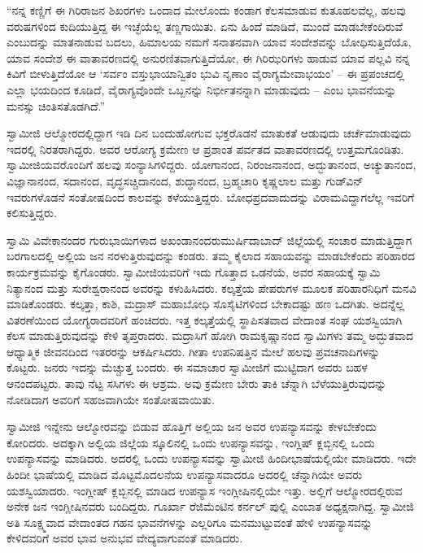  “ನನ್ನ ಕಣ್ಣಿಗೆ ಈ ಗಿರಿರಾಜನ ಶಿಖರಗಳು ಒಂದಾದ ಮೇಲೊಂದು ಕಂಡಾಗ ಕೆಲಸಮಾಡುವ ಕುತೂಹಲವೆಲ್ಲ, ಹಲವು ವರುಷಗಳಿಂದ ಕುದಿಯುತ್ತಿದ್ದ ಈ ಇಚ್ಛೆಯೆಲ್ಲ ತಣ್ಣಗಾಯಿತು. ಏನು ಹಿಂದೆ ಮಾಡಿದೆ, ಮುಂದೆ ಮಾಡಬೇಕೆಂದಿರುವೆ ಎಂಬುದನ್ನು ಮಾತನಾಡುವ ಬದಲು, ಹಿಮಾಲಯ ನಮಗೆ ಸನಾತನವಾಗಿ ಯಾವ ಸಂದೇಶವನ್ನು ಬೋಧಿಸುತ್ತಿದೆಯೊ, ಯಾವ ಸಂದೇಶ ಈ ವಾತಾವರಣದಲ್ಲಿ ಅನುರಣಿತವಾಗುತ್ತಿದೆಯೋ, ಈ ಗಿರಿಝರಿಗಳು ಹಾಡುವ ಯಾವ ಪಲ್ಲವಿ ನನ್ನ ಕಿವಿಗೆ ಬೀಳುತ್ತಿದೆಯೋ ಆ ‘ಸರ್ವಂ ವಸ್ತುಭಾಯಾನ್ವಿತಂ ಭುವಿ ನೃಣಾಂ ವೈರಾಗ್ಯಮೇವಾಭಯಂ’ – ಈ ಪ್ರಪಂಚದಲ್ಲಿ ಎಲ್ಲಾ ಭಯದಿಂದ ಕೂಡಿದೆ, ವೈರಾಗ್ಯವೊಂದೇ ಒಬ್ಬನನ್ನು ನಿರ್ಭೀತನನ್ನಾಗಿ ಮಾಡುವುದು – ಎಂಬ ಭಾವನೆಯನ್ನು ಮನಸ್ಸು ಚಿಂತಿಸತೊಡಗಿದೆ.” 

 ಸ್ವಾಮೀಜಿ ಆಲ್ಮೋರದಲ್ಲಿದ್ದಾಗ ಇಡಿ ದಿನ ಬಂದುಹೋಗುವ ಭಕ್ತರೊಡನೆ ಮಾತುಕತೆ ಆಡುವುದು ಚರ್ಚೆಮಾಡುವುದು ಇದರಲ್ಲಿ ನಿರತರಾಗಿದ್ದರು. ಅವರ ಆರೋಗ್ಯ ಕ್ರಮೇಣ ಆ ಪ್ರಶಾಂತ ಪರ್ವತದ ವಾತಾವರಣದಲ್ಲಿ ಉತ್ತಮಗೊಂಡಿತು. ಸ್ವಾಮೀಜಿಯವರೊಂದಿಗೆ ಹಲವು ಸಂನ್ಯಾಸಿಗಳಿದ್ದರು. ಯೋಗಾನಂದ, ನಿರಂಜನಾನಂದ, ಅದ್ಭುತಾನಂದ, ಅಚ್ಯುತಾನಂದ, ವಿಜ್ಞಾನಾನಂದ, ಸದಾನಂದ, ವೃದ್ಧಸಚ್ಚಿದಾನಂದ, ಶುದ್ಧಾನಂದ, ಬ್ರಹ್ಮಚಾರಿ ಕೃಷ್ಣಲಾಲ ಮತ್ತು ಗುಡ್‍ವಿನ್ ಇವರುಗಳೊಡನೆ ಸಂತೋಷದಿಂದ ಕಾಲವನ್ನು ಕಳೆಯುತ್ತಿದ್ದರು. ಬೋಧಪ್ರದವಾದುದನ್ನು ವಿರಾಮವಿದ್ದಾಗಲೆಲ್ಲ ಇವರಿಗೆ ಕಲಿಸುತ್ತಿದ್ದರು. 

 ಸ್ವಾಮಿ ವಿವೇಕಾನಂದರ ಗುರುಭಾಯಿಗಳಾದ ಅಖಂಡಾನಂದರು\break ಮುರ್ಷಿದಾಬಾದ್ ಜಿಲ್ಲೆಯಲ್ಲಿ ಸಂಚಾರ ಮಾಡುತ್ತಿದ್ದಾಗ ಬರಗಾಲದಲ್ಲಿ ಅಲ್ಲಿಯ ಜನ ನರಳುತ್ತಿರುವುದನ್ನು ಕಂಡರು. ತಮ್ಮ ಕೈಲಾದ ಸಹಾಯವನ್ನು ಮಾಡಬೇಕೆಂದು ಪರಿಹಾರದ ಕಾರ್ಯಕ್ರಮವನ್ನು ಕೈಗೊಂಡರು. ಸ್ವಾಮೀಜಿಯವರಿಗೆ ಇದು ಗೊತ್ತಾದ ಒಡನೆಯೆ, ಅವರ ಸಹಾಯಕ್ಕೆ ಸ್ವಾಮಿ ನಿತ್ಯಾನಂದ ಮತ್ತು ಸುರೇಶ್ವರಾನಂದ ಅವರನ್ನು ಕಳುಹಿಸಿದರು. ಕಲ್ಕತ್ತೆಯ ಪೇಪರುಗಳ ಮೂಲಕ ಪರಿಹಾರನಿಧಿಗೆ ಮನವಿ ಮಾಡಿಕೊಂಡರು. ಕಲ್ಕತ್ತಾ, ಕಾಶಿ, ಮದ್ರಾಸ್ ಮಹಾಬೋಧಿ ಸೊಸೈಟಿಗಳಿಂದ ಬೇಕಾದಷ್ಟು ಹಣ ಒದಗಿತು. ಅದನ್ನೆಲ್ಲ ವಿತರಣೆಯಿಂದ ಯೋಗ್ಯರಾದವರಿಗೆ ಹಂಚಿದರು. ಇತ್ತ ಕಲ್ಕತ್ತೆಯಲ್ಲಿ ಸ್ಥಾಪಿಸತವಾದ ವೇದಾಂತ ಸಂಘ ಯಶಸ್ವಿಯಾಗಿ ಕೆಲಸ ಮಾಡುತ್ತಿರುವುದನ್ನು ಕೇಳಿ ತೃಪ್ತರಾದರು. ಮದ್ರಾಸಿಗೆ ಹೋಗಿ ರಾಮಕೃಷ್ಣಾನಂದ ಸ್ವಾಮಿಗಳು ತಮ್ಮ ಅದ್ಭುತವಾದ ಆಧ್ಯಾತ್ಮಿಕ ಜೀವನದಿಂದ ಇತರರನ್ನು ಆಕರ್ಷಿಸಿದರು. ಗೀತಾ ಉಪನಿಷತ್ತಿನ ಮೇಲೆ ಹಲವು ಪ್ರವಚನಾದಿಗಳನ್ನು ಕೊಟ್ಟರು. ಜನರು ಇದನ್ನು ಮೆಚ್ಚುತ್ತ ಬಂದರು. ಈ ಸಮಾಚಾರ ಸ್ವಾಮೀಜಿಗೆ ಮುಟ್ಟಿದಾಗ ಅವರು ಬಹಳ ಆನಂದಪಟ್ಟರು. ತಾವು ನೆಟ್ಟ ಸಸಿಗಳು ಈ ಆಶ್ರಮ. ಅವು ಕ್ರಮೇಣ ಬೇರು ತಾಕಿ ಚೆನ್ನಾಗಿ ಬೆಳೆಯುತ್ತಿರುವುದನ್ನು ನೋಡಿದಾಗ ಅವರಿಗೆ ಸಹಜವಾಗಿಯೇ ಸಂತೋಷವಾಯಿತು. 

 ಸ್ವಾಮೀಜಿ ಇನ್ನೇನು ಆಲ್ಮೋರವನ್ನು ಬಿಡುವ ಹೊತ್ತಿಗೆ ಅಲ್ಲಿಯ ಜನ ಅವರ ಉಪನ್ಯಾಸವನ್ನು ಕೇಳಬೇಕೆಂದು ಕೋರಿದರು. ಅದಕ್ಕಾಗಿ ಅಲ್ಲಿಯ ಜಿಲ್ಲೆಯ ಸ್ಕೂಲಿನಲ್ಲಿ ಒಂದು ಉಪನ್ಯಾಸವನ್ನು, ಇಂಗ್ಲಿಷ್ ಕ್ಲಬ್ಬಿನಲ್ಲಿ ಒಂದು ಉಪನ್ಯಾಸವನ್ನು ಮಾಡಿದರು. ಅದರಲ್ಲಿ ಒಂದು ಉಪನ್ಯಾಸವನ್ನು ಸ್ವಾಮೀಜಿ ಹಿಂದೀಭಾಷೆಯಲ್ಲಿಯೇ ಮಾಡಿದರು. ಇದೇ ಹಿಂದೀ ಭಾಷೆಯಲ್ಲಿ ಮಾಡಿದ ಮೊಟ್ಟಮೊದಲನೆಯ ಉಪನ್ಯಾಸವಾದರೂ ಅದರಲ್ಲಿ ಚೆನ್ನಾಗಿಯೇ ಅವರು ಯಶಸ್ವಿಯಾದರು. ಇಂಗ್ಲೀಷ್ ಕ್ಲಬ್ಬಿನಲ್ಲಿ ಮಾಡಿದ ಉಪನ್ಯಾಸ ಇಂಗ್ಲೀಷಿನಲ್ಲಿಯೇ ಇತ್ತು. ಅಲ್ಲಿಗೆ ಆಲ್ಮೋರದಲ್ಲಿರುವ ಅನೇಕ ಜನ ಇಂಗ್ಲೀಷಿನವರು ಬಂದಿದ್ದರು. ಗೂರ್ಖಾ ರೆಜಿಮೆಂಟಿನ ಕರ್ನಲ್ ಪುಲ್ಲಿ ಎಂಬಾತ ಅಧ್ಯಕ್ಷನಾಗಿದ್ದ. ಸ್ವಾಮೀಜಿ ಅತಿ ಸೂಕ್ಷ್ಮವಾದ ವೇದಾಂತದ ಗಹನ ಭಾವನೆಗಳನ್ನು ಎಲ್ಲರಿಗೂ ಮನಮುಟ್ಟುವಂತೆ ಹೇಳಿ ಉಪನ್ಯಾಸವನ್ನು ಕೇಳಿದವರಿಗೆ ಅವರ ಭಾವ ಅನುಭವ ವೇದ್ಯವಾಗುವಂತೆ ಮಾಡಿದರು. 

